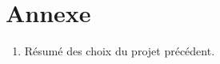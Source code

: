\documentclass{article}
\begin{document}
\newpage
\section{Annexe}
\begin{enumerate}
  \item Résumé des choix du projet précédent.
\end{enumerate}

\newpage
\begingroup
  \renewcommand{\section}[2]{\Large\textbf{Références}\normalsize}
  
  
  \nocite{*}
\endgroup
\end{document}
